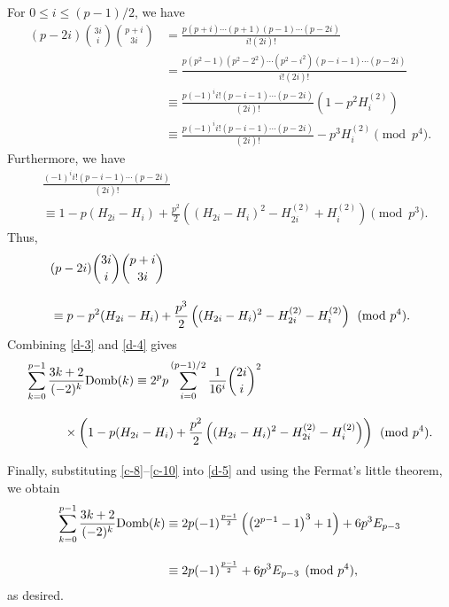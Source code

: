 \documentclass[12pt]{article}
\numberwithin{equation}{section}
\begin{document}
For $0\le i\le (p-1)/2$, we have
\begin{align*}
(p-2i){3i\choose i}{p+i\choose 3i}
&=\frac{p(p+i)\cdots(p+1)(p-1)\cdots(p-2i)}{i!(2i)!}\\[10pt]
&=\frac{p(p^2-1)(p^2-2^2)\cdots(p^2-i^2)(p-i-1)\cdots(p-2i)}{i!(2i)!}\\[10pt]
&\equiv \frac{p(-1)^ii!(p-i-1)\cdots(p-2i)}{(2i)!}\left(1-p^2H_i^{(2)}\right)\\[10pt]
&\equiv \frac{p(-1)^ii!(p-i-1)\cdots(p-2i)}{(2i)!}-p^3H_i^{(2)}\pmod{p^4}.
\end{align*}
Furthermore, we have
\begin{align*}
&\frac{(-1)^ii!(p-i-1)\cdots(p-2i)}{(2i)!}\\
&\equiv 1-p(H_{2i}-H_i)+\frac{p^2}{2}\left((H_{2i}-H_i)^2-H_{2i}^{(2)}+H_i^{(2)}\right)\pmod{p^3}.
\end{align*}
Thus,
\begin{align}
&(p-2i){3i\choose i}{p+i\choose 3i}\notag\\[10pt]
&\equiv p-p^2(H_{2i}-H_i)+\frac{p^3}{2}\left((H_{2i}-H_i)^2-H_{2i}^{(2)}-H_i^{(2)}\right)\pmod{p^4}.
\label{d-4}
\end{align}
Combining \eqref{d-3} and \eqref{d-4} gives
\begin{align}
\sum_{k=0}^{p-1}\frac{3k+2}{(-2)^k}{\rm Domb}(k)
&\equiv 2^p p\sum_{i=0}^{(p-1)/2}\frac{1}{16^i}{2i\choose i}^2\notag\\[10pt]
&\hskip-20mm\times\left(1-p(H_{2i}-H_i)+\frac{p^2}{2}\left((H_{2i}-H_i)^2-H_{2i}^{(2)}-H_i^{(2)}\right)\right)
\pmod{p^4}.\label{d-5}
\end{align}

Finally, substituting \eqref{c-8}--\eqref{c-10} into \eqref{d-5} and using the Fermat's little theorem, we obtain
\begin{align*}
\sum_{k=0}^{p-1}\frac{3k+2}{(-2)^k}{\rm Domb}(k)
&\equiv 2p(-1)^{\frac{p-1}{2}}\left(\left(2^{p-1}-1\right)^3+1\right)+6p^3E_{p-3}\\[10pt]
&\equiv 2p(-1)^{\frac{p-1}{2}}+6p^3E_{p-3}\pmod{p^4},
\end{align*}
as desired.
\end{document}
